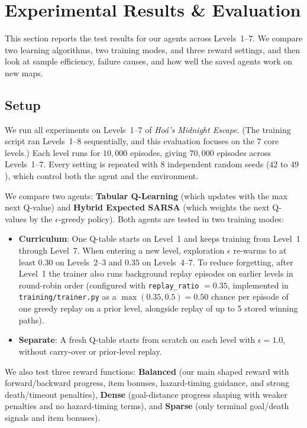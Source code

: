 \section{Experimental Results \& Evaluation}
\label{sec:eval}

This section reports the test results for our agents across Levels~1--7. We compare two learning algorithms, two training modes, and three reward settings, and then look at sample efficiency, failure causes, and how well the saved agents work on new maps.

\subsection{Setup}
\label{subsec:setup}

We run all experiments on Levels~1--7 of \textit{Ho{\'a}'s Midnight Escape}. (The training script ran Levels~1--8 sequentially, and this evaluation focuses on the 7 core levels.) Each level runs for $10{,}000$ episodes, giving $70{,}000$ episodes across Levels~1--7. Every setting is repeated with $8$ independent random seeds ($42$ to $49$), which control both the agent and the environment.

We compare two agents: \textbf{Tabular Q-Learning} (which updates with the max next Q-value) and \textbf{Hybrid Expected SARSA} (which weights the next Q-values by the $\epsilon$-greedy policy). Both agents are tested in two training modes:
\begin{itemize}
    \item \textbf{Curriculum}: One Q-table starts on Level~1 and keeps training from Level~1 through Level~7. When entering a new level, exploration $\epsilon$ re-warms to at least $0.30$ on Levels~2--3 and $0.35$ on Levels~4--7. To reduce forgetting, after Level~1 the trainer also runs background replay episodes on earlier levels in round-robin order (configured with \texttt{replay\_ratio} $= 0.35$, implemented in \texttt{training/trainer.py} as a $\max(0.35, 0.5) = 0.50$ chance per episode of one greedy replay on a prior level, alongside replay of up to 5 stored winning paths).
    \item \textbf{Separate}: A fresh Q-table starts from scratch on each level with $\epsilon = 1.0$, without carry-over or prior-level replay.
\end{itemize}

We also test three reward functions: \textbf{Balanced} (our main shaped reward with forward/backward progress, item bonuses, hazard-timing guidance, and strong death/timeout penalties), \textbf{Dense} (goal-distance progress shaping with weaker penalties and no hazard-timing terms), and \textbf{Sparse} (only terminal goal/death signals and item bonuses).

